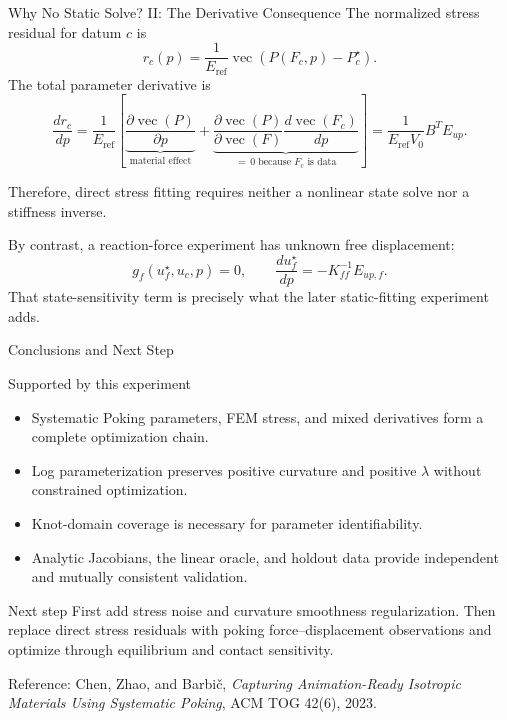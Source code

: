 \documentclass[aspectratio=169,10pt]{beamer}
\newcommand{\vect}[1]{\operatorname{vec}\!\left(#1\right)}
\newcommand{\eref}{E_{\mathrm{ref}}}
\begin{document}
\begin{frame}{Why No Static Solve? II: The Derivative Consequence}
  \small
  The normalized stress residual for datum $c$ is
  \[
    r_c(p)
    =
    \frac{1}{\eref}
    \vect{P(F_c,p)-P_c^\star}.
  \]
  The total parameter derivative is
  \[
    \frac{dr_c}{dp}
    =
    \frac{1}{\eref}
    \left[
      \underbrace{\frac{\partial\vect{P}}{\partial p}}_{\text{material effect}}
      +
      \underbrace{\frac{\partial\vect{P}}{\partial\vect F}
      \frac{d\vect{F_c}}{dp}}_{=\,0\text{ because }F_c\text{ is data}}
    \right]
    =
    \boxed{
      \frac{1}{\eref V_0}B^TE_{up}
    }.
  \]

  Therefore, direct stress fitting requires neither a nonlinear state solve
  nor a stiffness inverse.

  By contrast, a reaction-force experiment has unknown free displacement:
  \[
    g_f(u_f^\star,u_c,p)=0,
    \qquad
    \frac{du_f^\star}{dp}=-K_{ff}^{-1}E_{up,f}.
  \]
  That state-sensitivity term is precisely what the later static-fitting
  experiment adds.
\end{frame}

\begin{frame}{Conclusions and Next Step}
  \begin{block}{Supported by this experiment}
    \begin{itemize}
      \item Systematic Poking parameters, FEM stress, and mixed derivatives
        form a complete optimization chain.
      \item Log parameterization preserves positive curvature and positive
        $\lambda$ without constrained optimization.
      \item Knot-domain coverage is necessary for parameter identifiability.
      \item Analytic Jacobians, the linear oracle, and holdout data provide
        independent and mutually consistent validation.
    \end{itemize}
  \end{block}

  \vspace{0.5em}
  \begin{alertblock}{Next step}
    First add stress noise and curvature smoothness regularization. Then replace
    direct stress residuals with poking force--displacement observations and
    optimize through equilibrium and contact sensitivity.
  \end{alertblock}

  \vfill
  \scriptsize
  Reference: Chen, Zhao, and Barbi\v{c},
  \emph{Capturing Animation-Ready Isotropic Materials Using Systematic Poking},
  ACM TOG 42(6), 2023.
\end{frame}
\end{document}
